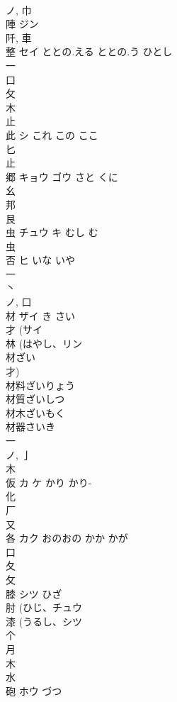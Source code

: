\documentclass[8pt]{extreport}
\begin{document}
\begin{CJK}{UTF8}{min}
\\	ノ, 巾 
\\	陣	ジン		
\\	阡, 車 
\\	整	セイ	ととの.える ととの.う ひとし	
\\	一 
\\	口 
\\	攵 
\\	木 
\\	止 
\\	此	シ	これ この ここ	
\\	匕 
\\	止 
\\	郷	キョウ ゴウ	さと くに	
\\	幺 
\\	邦 
\\	艮 
\\	虫	チュウ キ	むし む	
\\	虫 
\\	否	ヒ	いな いや	
\\	一 
\\	丶 
\\	ノ, 口 
\\	材	ザイ	き さい	
\\	才 (サイ 
\\	林 (はやし、リン 
\\	材ざい 
\\	才)
\\	材料ざいりょう 
\\	材質ざいしつ 
\\	材木ざいもく 
\\	材器さいき 
\\	一 
\\	ノ, 亅 
\\	木 
\\	仮	カ ケ	かり かり-	
\\	化 
\\	厂 
\\	又 
\\	各	カク	おのおの かか かが	
\\	口 
\\	夂 
\\	攵 
\\	膝	シツ	ひざ	
\\	肘 (ひじ、チュウ 
\\	漆 (うるし、シツ 
\\	个 
\\	月 
\\	木 
\\	水 
\\	砲	ホウ	づつ	

\end{CJK}
\end{document}
